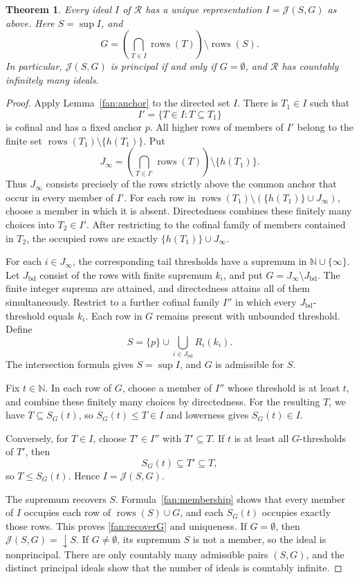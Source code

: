 \documentclass[10pt,a4paper]{article}
\newtheorem{theorem}{Theorem}[section]
\theoremstyle{definition}
\newcommand{\N}{\mathbb N}
\newcommand{\RR}{\mathcal R}
\newcommand{\rows}{\operatorname{rows}}
\begin{document}
\begin{theorem}\label{fan:ideals}
Every ideal $I$ of $\RR$ has a unique representation $I=\mathcal J(S,G)$ as above. Here $S=\sup I$, and
\begin{equation}\label{fan:recoverG}
 G=\left(\bigcap_{T\in I}\rows(T)\right)\setminus\rows(S).
\end{equation}
In particular, $\mathcal J(S,G)$ is principal if and only if $G=\emptyset$, and $\RR$ has countably infinitely many ideals.
\end{theorem}
\begin{proof}
Apply Lemma~\ref{fan:anchor} to the directed set $I$. There is $T_1\in I$ such that
\[
 I' =\{T\in I:T\subseteq T_1\}
\]
is cofinal and has a fixed anchor $p$. All higher rows of members of $I'$ belong to the finite set $\rows(T_1)\setminus\{h(T_1)\}$. Put
\[
 J_\infty=\left(\bigcap_{T\in I'}\rows(T)\right)\setminus\{h(T_1)\}.
\]
Thus $J_\infty$ consists precisely of the rows strictly above the common anchor that occur in every member of $I'$. For each row in $\rows(T_1)\setminus(\{h(T_1)\}\cup J_\infty)$, choose a member in which it is absent. Directedness combines these finitely many choices into $T_2\in I'$. After restricting to the cofinal family of members contained in $T_2$, the occupied rows are exactly $\{h(T_1)\}\cup J_\infty$.

For each $i\in J_\infty$, the corresponding tail thresholds have a supremum in $\N\cup\{\infty\}$. Let $J_{\mathrm{bd}}$ consist of the rows with finite supremum $k_i$, and put $G=J_\infty\setminus J_{\mathrm{bd}}$. The finite integer suprema are attained, and directedness attains all of them simultaneously. Restrict to a further cofinal family $I''$ in which every $J_{\mathrm{bd}}$-threshold equals $k_i$. Each row in $G$ remains present with unbounded threshold. Define
\[
 S=\{p\}\cup\bigcup_{i\in J_{\mathrm{bd}}}R_i(k_i).
\]
The intersection formula gives $S=\sup I$, and $G$ is admissible for $S$.

Fix $t\in\N$. In each row of $G$, choose a member of $I''$ whose threshold is at least $t$, and combine these finitely many choices by directedness. For the resulting $T$, we have $T\subseteq S_G(t)$, so $S_G(t)\leq T\in I$ and lowerness gives $S_G(t)\in I$.

Conversely, for $T\in I$, choose $T'\in I''$ with $T'\subseteq T$. If $t$ is at least all $G$-thresholds of $T'$, then
\[
 S_G(t)\subseteq T'\subseteq T,
\]
so $T\leq S_G(t)$. Hence $I=\mathcal J(S,G)$.

The supremum recovers $S$. Formula~\eqref{fan:membership} shows that every member of $I$ occupies each row of $\rows(S)\cup G$, and each $S_G(t)$ occupies exactly those rows. This proves \eqref{fan:recoverG} and uniqueness. If $G=\emptyset$, then $\mathcal J(S,G)={\downarrow} S$. If $G\neq\emptyset$, its supremum $S$ is not a member, so the ideal is nonprincipal. There are only countably many admissible pairs $(S,G)$, and the distinct principal ideals show that the number of ideals is countably infinite.
\end{proof}
\end{document}
